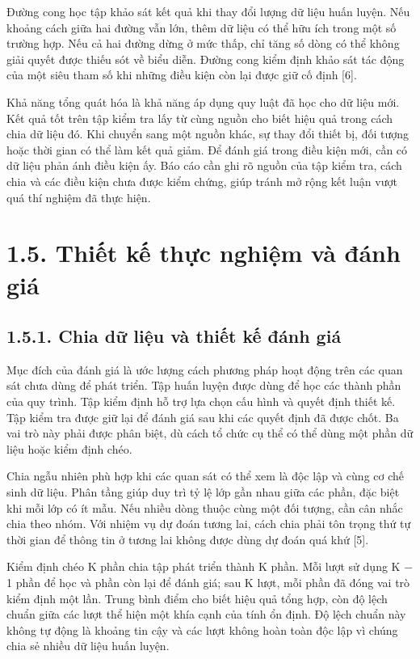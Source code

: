 Đường cong học tập khảo sát kết quả khi thay đổi lượng dữ liệu huấn luyện. Nếu khoảng cách giữa hai đường vẫn lớn, thêm dữ liệu có thể hữu ích trong một số trường hợp. Nếu cả hai đường dừng ở mức thấp, chỉ tăng số dòng có thể không giải quyết được thiếu sót về biểu diễn. Đường cong kiểm định khảo sát tác động của một siêu tham số khi những điều kiện còn lại được giữ cố định [6].


Khả năng tổng quát hóa là khả năng áp dụng quy luật đã học cho dữ liệu mới. Kết quả tốt trên tập kiểm tra lấy từ cùng nguồn cho biết hiệu quả trong cách chia dữ liệu đó. Khi chuyển sang một nguồn khác, sự thay đổi thiết bị, đối tượng hoặc thời gian có thể làm kết quả giảm. Để đánh giá trong điều kiện mới, cần có dữ liệu phản ánh điều kiện ấy. Báo cáo cần ghi rõ nguồn của tập kiểm tra, cách chia và các điều kiện chưa được kiểm chứng, giúp tránh mở rộng kết luận vượt quá thí nghiệm đã thực hiện.


\section{1.5. Thiết kế thực nghiệm và đánh giá}

\subsection{1.5.1. Chia dữ liệu và thiết kế đánh giá}

Mục đích của đánh giá là ước lượng cách phương pháp hoạt động trên các quan sát chưa dùng để phát triển. Tập huấn luyện được dùng để học các thành phần của quy trình. Tập kiểm định hỗ trợ lựa chọn cấu hình và quyết định thiết kế. Tập kiểm tra được giữ lại để đánh giá sau khi các quyết định đã được chốt. Ba vai trò này phải được phân biệt, dù cách tổ chức cụ thể có thể dùng một phần dữ liệu hoặc kiểm định chéo.


Chia ngẫu nhiên phù hợp khi các quan sát có thể xem là độc lập và cùng cơ chế sinh dữ liệu. Phân tầng giúp duy trì tỷ lệ lớp gần nhau giữa các phần, đặc biệt khi mỗi lớp có ít mẫu. Nếu nhiều dòng thuộc cùng một đối tượng, cần cân nhắc chia theo nhóm. Với nhiệm vụ dự đoán tương lai, cách chia phải tôn trọng thứ tự thời gian để thông tin ở tương lai không được dùng dự đoán quá khứ [5].


Kiểm định chéo K phần chia tập phát triển thành K phần. Mỗi lượt sử dụng K \ensuremath{-} 1 phần để học và phần còn lại để đánh giá; sau K lượt, mỗi phần đã đóng vai trò kiểm định một lần. Trung bình điểm cho biết hiệu quả tổng hợp, còn độ lệch chuẩn giữa các lượt thể hiện một khía cạnh của tính ổn định. Độ lệch chuẩn này không tự động là khoảng tin cậy và các lượt không hoàn toàn độc lập vì chúng chia sẻ nhiều dữ liệu huấn luyện.


